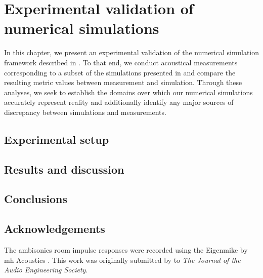 \chapter{Experimental validation of numerical simulations}\label{chap:10_Experimental_Validation}
In this chapter, we present an experimental validation of the numerical simulation framework described in .
To that end, we conduct acoustical measurements corresponding to a subset of the simulations presented in  and compare the resulting metric values between measurement and simulation.
Through these analyses, we seek to establish the domains over which our numerical simulations accurately represent reality and additionally identify any major sources of discrepancy between simulations and measurements.

\section{Experimental setup}\label{sec:10_Experimental_Validation:Experiments}


\section{Results and discussion}\label{sec:10_Experimental_Validation:Results}


\section{Conclusions}\label{sec:10_Experimental_Validation:Conclusions}


\section*{Acknowledgements}
The ambisonics room impulse responses were recorded using the Eigenmike by mh Acoustics \citep{EigenmikeURL}.
This work was originally submitted by \citet[section 6]{TylkaChoueiri2019b} to \textit{The Journal of the Audio Engineering Society}.